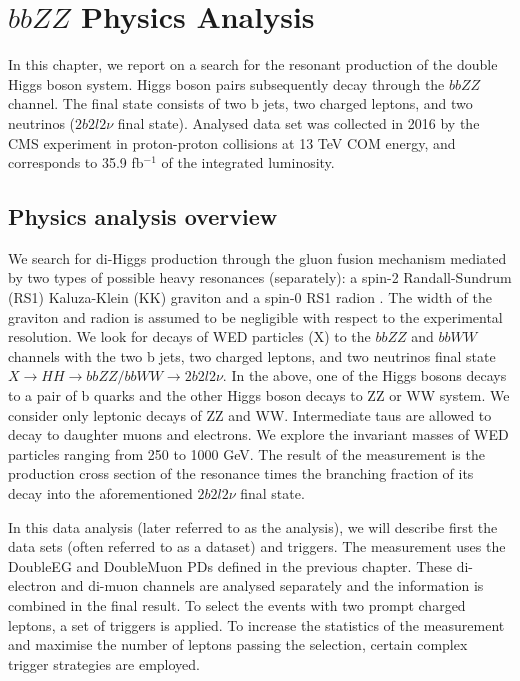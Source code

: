 \chapter{$bbZZ$ Physics Analysis}

In this chapter, we report on a search for the resonant production of the double Higgs boson system. Higgs boson pairs subsequently decay through the $bbZZ$ channel. The final state consists of two b jets, two charged leptons, and two neutrinos ($2 b 2 l 2 \nu$ final state). Analysed data set was collected in 2016 by the CMS experiment in proton-proton collisions  at  13  TeV COM energy, and corresponds to 35.9 fb$^{-1}$ of the integrated luminosity.  


\section{Physics analysis overview}
\label{sec:an_overview}

We search for di-Higgs production through  the  gluon fusion mechanism mediated by two types of possible heavy resonances (separately): a spin-2 Randall-Sundrum (RS1) Kaluza-Klein (KK) graviton and a spin-0 RS1 radion \cite{WED, Xanda}. The width of the graviton and radion is assumed to be negligible with respect to the experimental resolution. We look for decays of WED particles (X) to the $bbZZ$ and $bbWW$ channels with the two b jets, two charged leptons, and two neutrinos final state $X \rightarrow HH \rightarrow bbZZ/bbWW \rightarrow 2 b 2l 2 \nu$. In the above, one of the Higgs bosons decays to a pair of b quarks and the other Higgs boson decays to ZZ or WW system. We consider only leptonic decays of ZZ and WW. Intermediate taus are allowed to decay to daughter muons and electrons.  We explore the invariant masses of WED particles ranging from 250 to 1000  GeV. The result of the measurement is the production cross section of the resonance times the branching fraction of its decay into the aforementioned $2 b 2 l 2 \nu$ final state. 

In this data analysis (later referred to as the analysis), we will describe first the data sets (often referred to as a dataset) and triggers. The measurement uses the DoubleEG and DoubleMuon PDs defined in the previous chapter. These di-electron and di-muon channels are analysed separately and the information is combined in the final result. To select the events with two prompt charged leptons, a set of triggers is applied. To increase the statistics of the measurement and maximise the number of leptons passing the selection, certain complex trigger strategies are employed. 

